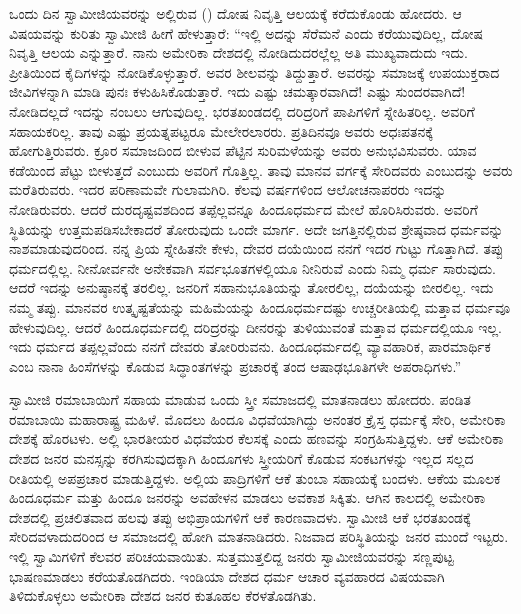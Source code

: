 ಒಂದು ದಿನ ಸ್ವಾಮೀಜಿಯವರನ್ನು ಅಲ್ಲಿರುವ () ದೋಷ ನಿವೃತ್ತಿ ಆಲಯಕ್ಕೆ ಕರೆದುಕೊಂಡು ಹೋದರು. ಆ ವಿಷಯವನ್ನು ಕುರಿತು ಸ್ವಾಮೀಜಿ ಹೀಗೆ ಹೇಳುತ್ತಾರೆ: “ಇಲ್ಲಿ ಅದನ್ನು ಸೆರೆಮನೆ ಎಂದು ಕರೆಯುವುದಿಲ್ಲ, ದೋಷ ನಿವೃತ್ತಿ ಆಲಯ ಎನ್ನುತ್ತಾರೆ. ನಾನು ಅಮೇರಿಕಾ ದೇಶದಲ್ಲಿ ನೋಡಿದುದರಲ್ಲೆಲ್ಲ ಅತಿ ಮುಖ್ಯವಾದುದು ಇದು. ಪ್ರೀತಿಯಿಂದ ಕೈದಿಗಳನ್ನು ನೋಡಿಕೊಳ್ಳುತ್ತಾರೆ. ಅವರ ಶೀಲವನ್ನು ತಿದ್ದುತ್ತಾರೆ. ಅವರನ್ನು ಸಮಾಜಕ್ಕೆ ಉಪಯುಕ್ತರಾದ ಜೀವಿಗಳನ್ನಾಗಿ ಮಾಡಿ ಪುನಃ ಕಳುಹಿಸಿಕೊಡುತ್ತಾರೆ. ಇದು ಎಷ್ಟು ಚಮತ್ಕಾರವಾಗಿದೆ! ಎಷ್ಟು ಸುಂದರವಾಗಿದೆ! ನೋಡಿದಲ್ಲದೆ ಇದನ್ನು ನಂಬಲು ಆಗುವುದಿಲ್ಲ. ಭರತಖಂಡದಲ್ಲಿ ದರಿದ್ರರಿಗೆ ಪಾಪಿಗಳಿಗೆ ಸ್ನೇಹಿತರಿಲ್ಲ. ಅವರಿಗೆ ಸಹಾಯಕರಿಲ್ಲ. ತಾವು ಎಷ್ಟು ಪ್ರಯತ್ನಪಟ್ಟರೂ ಮೇಲೇರಲಾರರು. ಪ್ರತಿದಿನವೂ ಅವರು ಅಧಃಪತನಕ್ಕೆ ಹೋಗುತ್ತಿರುವರು. ಕ್ರೂರ ಸಮಾಜದಿಂದ ಬೀಳುವ ಪೆಟ್ಟಿನ ಸುರಿಮಳೆಯನ್ನು ಅವರು ಅನುಭವಿಸುವರು. ಯಾವ ಕಡೆಯಿಂದ ಪೆಟ್ಟು ಬೀಳುತ್ತದೆ ಎಂಬುದು ಅವರಿಗೆ ಗೊತ್ತಿಲ್ಲ. ತಾವು ಮಾನವ ವರ್ಗಕ್ಕೆ ಸೇರಿದವರು ಎಂಬುದನ್ನು ಅವರು ಮರೆತಿರುವರು. ಇದರ ಪರಿಣಾಮವೇ ಗುಲಾಮಗಿರಿ. ಕೆಲವು ವರ್ಷಗಳಿಂದ ಆಲೋಚನಾಪರರು ಇದನ್ನು ನೋಡಿರುವರು. ಆದರೆ ದುರದೃಷ್ಟವಶದಿಂದ ತಪ್ಪೆಲ್ಲವನ್ನೂ ಹಿಂದೂಧರ್ಮದ ಮೇಲೆ ಹೊರಿಸಿರುವರು. ಅವರಿಗೆ ಸ್ಥಿತಿಯನ್ನು ಉತ್ತಮಪಡಿಸಬೇಕಾದರೆ ತೋರುವುದು ಒಂದೇ ಮಾರ್ಗ. ಅದೇ ಜಗತ್ತಿನಲ್ಲಿರುವ ಶ್ರೇಷ್ಠವಾದ ಧರ್ಮವನ್ನು ನಾಶಮಾಡುವುದರಿಂದ. ನನ್ನ ಪ್ರಿಯ ಸ್ನೇಹಿತನೇ ಕೇಳು, ದೇವರ ದಯೆಯಿಂದ ನನಗೆ ಇದರ ಗುಟ್ಟು ಗೊತ್ತಾಗಿದೆ. ತಪ್ಪು ಧರ್ಮದಲ್ಲಿಲ್ಲ. ನೀನೋರ್ವನೇ ಅನೇಕವಾಗಿ ಸರ್ವಭೂತಗಳಲ್ಲಿಯೂ ನೀನಿರುವೆ ಎಂದು ನಿಮ್ಮ ಧರ್ಮ ಸಾರುವುದು. ಆದರೆ ಇದನ್ನು ಅನುಷ್ಠಾನಕ್ಕೆ ತರಲಿಲ್ಲ. ಜನರಿಗೆ ಸಹಾನುಭೂತಿಯನ್ನು ತೋರಲಿಲ್ಲ, ದಯೆಯನ್ನು ಬೀರಲಿಲ್ಲ. ಇದು ನಮ್ಮ ತಪ್ಪು. ಮಾನವರ ಉತ್ಕೃಷ್ಟತೆಯನ್ನು ಮಹಿಮೆಯನ್ನು ಹಿಂದೂಧರ್ಮದಷ್ಟು ಉಚ್ಚರೀತಿಯಲ್ಲಿ ಮತ್ತಾವ ಧರ್ಮವೂ ಹೇಳುವುದಿಲ್ಲ. ಆದರೆ ಹಿಂದೂಧರ್ಮದಲ್ಲಿ ದರಿದ್ರರನ್ನು ದೀನರನ್ನು ತುಳಿಯುವಂತೆ ಮತ್ತಾವ ಧರ್ಮದಲ್ಲಿಯೂ ಇಲ್ಲ. ಇದು ಧರ್ಮದ ತಪ್ಪಲ್ಲವೆಂದು ನನಗೆ ದೇವರು ತೋರಿರುವನು. ಹಿಂದೂಧರ್ಮದಲ್ಲಿ ವ್ಯಾವಹಾರಿಕ, ಪಾರಮಾರ್ಥಿಕ ಎಂಬ ನಾನಾ ಹಿಂಸೆಗಳನ್ನು ಕೊಡುವ ಸಿದ್ಧಾಂತಗಳನ್ನು ಪ್ರಚಾರಕ್ಕೆ ತಂದ ಆಷಾಢಭೂತಿಗಳೇ ಅಪರಾಧಿಗಳು.” 

 ಸ್ವಾಮೀಜಿ ರಮಾಬಾಯಿಗೆ ಸಹಾಯ ಮಾಡುವ ಒಂದು ಸ್ತ್ರೀ ಸಮಾಜದಲ್ಲಿ ಮಾತನಾಡಲು ಹೋದರು. ಪಂಡಿತ ರಮಾಬಾಯಿ ಮಹಾರಾಷ್ಟ್ರ ಮಹಿಳೆ. ಮೊದಲು ಹಿಂದೂ ವಿಧವೆಯಾಗಿದ್ದು ಅನಂತರ ಕ್ರೈಸ್ತ ಧರ್ಮಕ್ಕೆ ಸೇರಿ, ಅಮೇರಿಕಾ ದೇಶಕ್ಕೆ ಹೊರಟಳು. ಅಲ್ಲಿ ಭಾರತೀಯರ ವಿಧವೆಯರ ಕೆಲಸಕ್ಕೆ ಎಂದು ಹಣವನ್ನು ಸಂಗ್ರಹಿಸುತ್ತಿದ್ದಳು. ಆಕೆ ಅಮೇರಿಕಾ ದೇಶದ ಜನರ ಮನಸ್ಸನ್ನು ಕರಗಿಸುವುದಕ್ಕಾಗಿ ಹಿಂದೂಗಳು ಸ್ತ್ರೀಯರಿಗೆ ಕೊಡುವ ಸಂಕಟಗಳನ್ನು ಇಲ್ಲದ ಸಲ್ಲದ ರೀತಿಯಲ್ಲಿ ಅಪಪ್ರಚಾರ ಮಾಡುತ್ತಿದ್ದಳು. ಅಲ್ಲಿಯ ಪಾದ್ರಿಗಳಿಗೆ ಆಕೆ ತುಂಬಾ ಸಹಾಯಕ್ಕೆ ಬಂದಳು. ಆಕೆಯ ಮೂಲಕ ಹಿಂದೂಧರ್ಮ ಮತ್ತು ಹಿಂದೂ ಜನರನ್ನು ಅವಹೇಳನ ಮಾಡಲು ಅವಕಾಶ ಸಿಕ್ಕಿತು. ಆಗಿನ ಕಾಲದಲ್ಲಿ ಅಮೇರಿಕಾ ದೇಶದಲ್ಲಿ ಪ್ರಚಲಿತವಾದ ಹಲವು ತಪ್ಪು ಅಭಿಪ್ರಾಯಗಳಿಗೆ ಆಕೆ ಕಾರಣವಾದಳು. ಸ್ವಾಮೀಜಿ ಆಕೆ ಭರತಖಂಡಕ್ಕೆ ಸೇರಿದವಳಾದುದರಿಂದ ಆ ಸಮಾಜದಲ್ಲಿ ಹೋಗಿ ಮಾತನಾಡಿದರು. ನಿಜವಾದ ಪರಿಸ್ಥಿತಿಯನ್ನು ಜನರ ಮುಂದೆ ಇಟ್ಟರು. ಇಲ್ಲಿ ಸ್ವಾಮಿಗಳಿಗೆ ಕೆಲವರ ಪರಿಚಯವಾಯಿತು. ಸುತ್ತಮುತ್ತಲಿದ್ದ ಜನರು ಸ್ವಾಮೀಜಿಯವರನ್ನು ಸಣ್ಣಪುಟ್ಟ ಭಾಷಣಮಾಡಲು ಕರೆಯತೊಡಗಿದರು. ಇಂಡಿಯಾ ದೇಶದ ಧರ್ಮ ಆಚಾರ ವ್ಯವಹಾರದ ವಿಷಯವಾಗಿ ತಿಳಿದುಕೊಳ್ಳಲು ಅಮೇರಿಕಾ ದೇಶದ ಜನರ ಕುತೂಹಲ ಕೆರಳತೊಡಗಿತು. 

